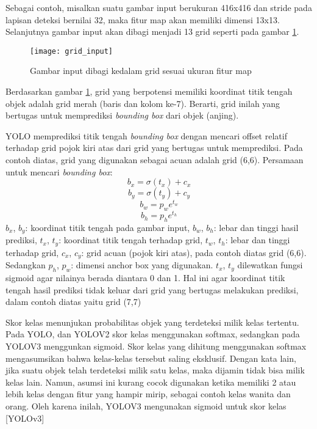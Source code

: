 \documentclass[../thesis.tex]{subfiles}
\begin{document}
Sebagai contoh, misalkan suatu gambar input berukuran 416x416 dan stride pada lapisan deteksi bernilai 32, maka fitur map akan memiliki dimensi 13x13. Selanjutnya gambar input akan dibagi menjadi 13 grid seperti pada gambar \ref{grid_YOLO}.
\begin{figure}
	\centering
	\texttt{[image: grid\_input]}
	\caption{Gambar input dibagi kedalam grid sesuai ukuran fitur map}
	\label{grid_YOLO}
\end{figure}
Berdasarkan gambar \ref{grid_YOLO}, grid yang berpotensi memiliki koordinat titik tengah objek adalah grid merah (baris dan kolom ke-7). Berarti, grid inilah yang bertugas untuk memprediksi \textit{bounding box} dari objek (anjing). 

YOLO memprediksi titik tengah \textit{bounding box} dengan mencari offset relatif terhadap grid pojok kiri atas dari grid yang bertugas untuk memprediksi. Pada contoh diatas, grid yang digunakan sebagai acuan adalah grid (6,6).
Persamaan untuk mencari \textit{bounding box}:
\begin{equation} \label{bx_bb}
	b_{x} = \sigma(t_{x}) + c_x
   \end{equation}
\begin{equation} \label{by_bb}
	b_{y} = \sigma(t_{y}) + c_y
\end{equation}
\begin{equation} \label{bw_bb}
	b_{w} = p_{w}e^{t_w}
\end{equation}
\begin{equation} \label{bh_bb}
	b_{h} = p_{h}e^{t_h}
\end{equation}
$b_x$, $b_y$: koordinat titik tengah pada gambar input, $b_w$, $b_h$: lebar dan tinggi hasil prediksi, $t_x$, $t_y$: koordinat titik tengah terhadap grid, $t_w$, $t_h$: lebar dan tinggi terhadap grid, $c_x$, $c_y$: grid acuan (pojok kiri atas), pada contoh diatas grid (6,6). Sedangkan $p_h$, $p_w$: dimensi anchor box yang digunakan. 
$t_x$, $t_y$ dilewatkan fungsi sigmoid agar nilainya berada diantara 0 dan 1. Hal ini agar koordinat titik tengah hasil prediksi tidak keluar dari grid yang bertugas melakukan prediksi, dalam contoh diatas yaitu grid (7,7)

Skor kelas menunjukan probabilitas objek yang terdeteksi milik kelas tertentu. Pada YOLO, dan YOLOV2 skor kelas menggunakan softmax, sedangkan pada YOLOV3 menggunkan sigmoid.
Skor kelas yang dihitung menggunakan softmax mengasumsikan bahwa kelas-kelas tersebut saling eksklusif. Dengan kata lain, jika suatu objek telah terdeteksi milik satu kelas, maka dijamin tidak bisa milik kelas lain. 
Namun, asumsi ini kurang cocok digunakan ketika memiliki 2 atau lebih kelas dengan fitur yang hampir mirip, sebagai contoh kelas wanita dan orang. Oleh karena inilah, YOLOV3 mengunakan sigmoid untuk skor kelas [YOLOv3]
\end{document}
